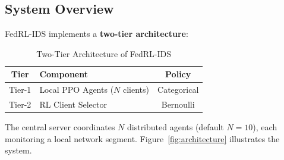 \documentclass[conference]{IEEEtran}
\begin{document}
\subsection{System Overview}

FedRL-IDS implements a \textbf{two-tier architecture}:

\begin{table}[t]
\centering
\caption{Two-Tier Architecture of FedRL-IDS}
\label{tab:tiers}
\begin{tabular}{cp{5.5cm}c}
\toprule
\textbf{Tier} & \textbf{Component} & \textbf{Policy} \\
\midrule
Tier-1 & Local PPO Agents ($N$ clients) & Categorical \\
Tier-2 & RL Client Selector & Bernoulli \\
\bottomrule
\end{tabular}
\end{table}

The central server coordinates $N$ distributed agents (default $N=10$), each monitoring a local network segment. Figure~\ref{fig:architecture} illustrates the system.
\end{document}
